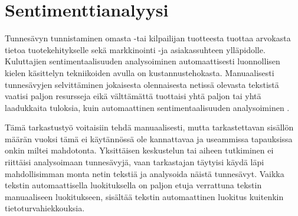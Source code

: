\section{Sentimenttianalyysi}

Tunnesävyn tunnistaminen omasta -tai kilpailijan tuotteesta tuottaa arvokasta tietoa tuotekehitykselle sekä markkinointi -ja asiakassuhteen ylläpidolle. Kuluttajien sentimentaalisuuden analysoiminen automaattisesti luonnollisen kielen käsittelyn tekniikoiden avulla on kustannustehokasta. Manuaalisesti tunnesävyjen selvittäminen jokaisesta olennaisesta netissä olevasta tekstistä vaatisi paljon resursseja eikä välttämättä tuottaisi yhtä paljon tai yhtä laadukkaita tuloksia, kuin automaattinen sentimentaalisuuden analysoiminen \citep{sentimentality}.

Tämä tarkastustyö voitaisiin tehdä manuaalisesti, mutta tarkastettavan sisällön määrän vuoksi tämä ei käytännössä ole kannattavaa ja useammissa tapauksissa onkin miltei mahdotonta. Yksittäisen keskustelun tai aiheen tutkiminen ei riittäisi analysoimaan tunnesävyjä, vaan tarkastajan täytyisi käydä läpi mahdollisimman monta netin tekstiä ja analysoida näistä tunnesävyt. Vaikka tekstin automaattisella luokituksella on paljon etuja verrattuna tekstin manuaaliseen luokitukseen, sisältää tekstin automaattinen luokitus kuitenkin tietoturvahiekkouksia.